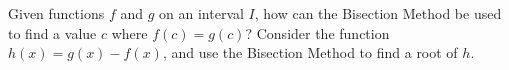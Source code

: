 {Given functions $f$ and $g$ on an interval $I$, how can the Bisection Method be used to find a value $c$ where $f(c) = g(c)$?}
{Consider the function $h(x) = g(x) - f(x)$, and use the Bisection Method to find a root of $h$.}
